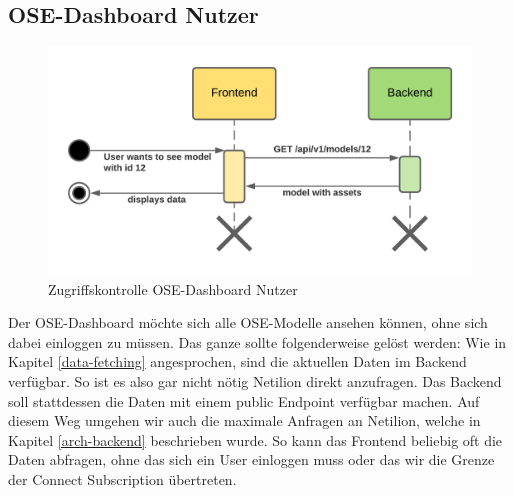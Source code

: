 \subsection{OSE-Dashboard Nutzer}
\begin{figure}[H]
  \centering
  \includegraphics[width=.6\linewidth]{./images/zugriffskontrolle2.png}
  \caption[{Sequenzdiagram, welches die Zugriffskontrolle für den OSE-Dashboard Nutzer beschreibt}]{Zugriffskontrolle OSE-Dashboard Nutzer}
  \label{fig:zugriffskontrolle2}
\end{figure}
Der OSE-Dashboard möchte sich alle OSE-Modelle ansehen können, ohne sich dabei einloggen zu müssen.
Das ganze sollte folgenderweise gelöst werden:
\newline
Wie in Kapitel \ref{data-fetching} angesprochen, sind die aktuellen Daten im Backend verfügbar. So ist es also gar nicht nötig Netilion direkt anzufragen. Das Backend soll stattdessen die Daten mit einem public Endpoint verfügbar machen. Auf diesem Weg umgehen wir auch die maximale Anfragen an Netilion, welche in Kapitel \ref{arch-backend} beschrieben wurde.
\newline
So kann das Frontend beliebig oft die Daten abfragen, ohne das sich ein User einloggen muss oder das wir die Grenze der Connect Subscription übertreten.
